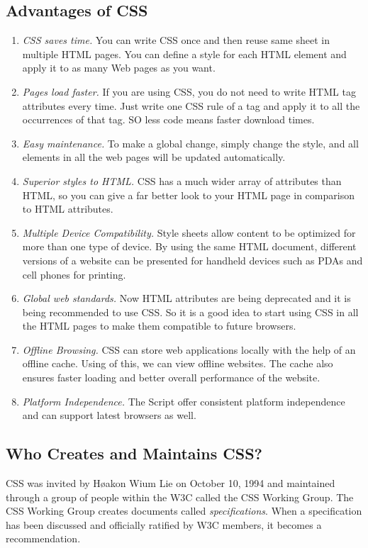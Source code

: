 \documentclass[a4paper,oneside]{book}
\numberwithin{equation}{chapter}
\begin{document}
\subsection{Advantages of CSS}
\begin{enumerate}
\item \textit{CSS saves time.} You can write CSS once and then reuse same sheet in multiple HTML pages. You can define a style for each HTML element and apply it to as many Web pages as you want.
\item \textit{Pages load faster.} If you are using CSS, you do not need to write HTML tag attributes every time. Just write one CSS rule of a tag and apply it to all the occurrences of that tag. SO less code means faster download times.
\item \textit{Easy maintenance.} To make a global change, simply change the style, and all elements in all the web pages will be updated automatically.
\item \textit{Superior styles to HTML.} CSS has a much wider array of attributes than HTML, so you can give a far better look to your HTML page in comparison to HTML attributes.
\item \textit{Multiple Device Compatibility.} Style sheets allow content to be optimized for more than one type of device. By using the same HTML document, different versions of a website can be presented for handheld devices such as PDAs and cell phones for printing.
\item \textit{Global web standards.} Now HTML attributes are being deprecated and it is being recommended to use CSS. So it is a good idea to start using CSS in all the HTML pages to make them compatible to future browsers.
\item \textit{Offline Browsing.} CSS can store web applications locally with the help of an offline cache. Using of this, we can view offline websites. The cache also ensures faster loading and better overall performance of the website.
\item \textit{Platform Independence.} The Script offer consistent platform independence and can support latest browsers as well.
\end{enumerate}
\subsection{Who Creates and Maintains CSS?}
CSS was invited by H\o{a}kon Wium Lie on October 10, 1994 and maintained through a group of people within the W3C called the CSS Working Group. The CSS Working Group creates documents called \textit{specifications}. When a specification has been discussed and officially ratified by W3C members, it becomes a recommendation.
\end{document}
